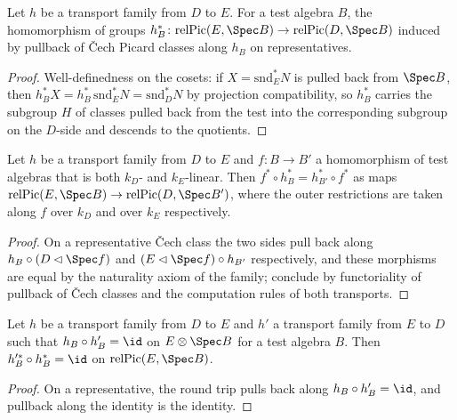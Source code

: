 \begin{definition}
  \label{def:relPicTransport}
  \leanok
  Let \(h\) be a transport family from \(D\) to \(E\). For a test algebra \(B\), the
  homomorphism of groups
  \(h_B^{*} \colon \mathrm{relPic}(E, \Spec B) \to \mathrm{relPic}(D, \Spec B)\) induced by
  pullback of \v Cech Picard classes along \(h_B\) on representatives.
\end{definition}
\begin{proof}
  \leanok
  Well-definedness on the cosets: if \(X = \mathrm{snd}_E^{*} N\) is pulled back from
  \(\Spec B\), then \(h_B^{*} X = h_B^{*}\, \mathrm{snd}_E^{*} N = \mathrm{snd}_D^{*} N\)
  by projection compatibility, so \(h_B^{*}\) carries the subgroup \(H\) of classes pulled
  back from the test into the corresponding subgroup on the \(D\)-side and descends to the
  quotients.
\end{proof}

\begin{lemma}
  \label{lem:relPicTransport_naturality}
  \leanok
  Let \(h\) be a transport family from \(D\) to \(E\) and \(f \colon B \to B'\) a
  homomorphism of test algebras that is both \(k_D\)- and \(k_E\)-linear. Then
  \(f^{*} \circ h_B^{*} = h_{B'}^{*} \circ f^{*}\) as maps
  \(\mathrm{relPic}(E, \Spec B) \to \mathrm{relPic}(D, \Spec B')\), where the outer
  restrictions are taken along \(f\) over \(k_D\) and over \(k_E\) respectively.
\end{lemma}
\begin{proof}
  \leanok
  On a representative \v Cech class the two sides pull back along
  \(h_B \circ (D \lhd \Spec f)\) and \((E \lhd \Spec f) \circ h_{B'}\) respectively, and
  these morphisms are equal by the naturality axiom of the family; conclude by
  functoriality of pullback of \v Cech classes and the computation rules of both
  transports.
\end{proof}

\begin{lemma}
  \label{lem:relPicTransport_inverse}
  \leanok
  Let \(h\) be a transport family from \(D\) to \(E\) and \(h'\) a transport family from
  \(E\) to \(D\) such that \(h_B \circ h'_B = \id\) on \(E \otimes \Spec B\) for a test
  algebra \(B\). Then \(h'^{*}_B \circ h_B^{*} = \id\) on
  \(\mathrm{relPic}(E, \Spec B)\).
\end{lemma}
\begin{proof}
  \leanok
  On a representative, the round trip pulls back along \(h_B \circ h'_B = \id\), and
  pullback along the identity is the identity.
\end{proof}

